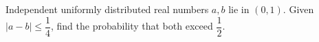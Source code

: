 Independent uniformly distributed real numbers $a,b$ lie in $(0,1)$. Given $|a-b|\le\dfrac{1}{4}$, find the probability that both exceed $\dfrac{1}{2}$.
